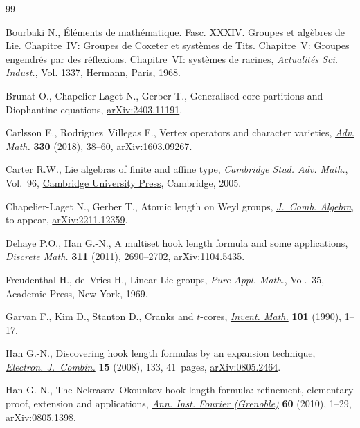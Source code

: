 \documentclass[pdftex]{sigma}
\numberwithin{equation}{section}
\begin{document}
\begin{thebibliography}{99}
\footnotesize\itemsep=0pt

Bourbaki N., \'El\'ements de math\'ematique. {F}asc. {XXXIV}. {G}roupes et
 alg\`ebres de {L}ie. {C}hapitre~{IV}: {G}roupes de {C}oxeter et syst\`emes de
 {T}its. {C}hapitre~{V}: {G}roupes engendr\'es par des r\'eflexions.
 {C}hapitre~{VI}: syst\`emes de racines, \textit{Actualit\'es Sci. Indust.},
 Vol. 1337, Hermann, Paris, 1968.

Brunat O., Chapelier-Laget N., Gerber T., Generalised core partitions and
 {D}iophantine equations, \href{https://arxiv.org/abs/2403.11191}{arXiv:2403.11191}.

Carlsson E., Rodriguez~Villegas F., Vertex operators and character varieties,
 \href{https://doi.org/10.1016/j.aim.2017.12.024}{\textit{Adv. Math.}} \textbf{330} (2018), 38--60, \href{https://arxiv.org/abs/1603.09267}{arXiv:1603.09267}.

Carter R.W., Lie algebras of finite and affine type, \textit{Cambridge Stud.
 Adv. Math.}, Vol.~96, \href{https://doi.org/10.1017/CBO9780511614910}{Cambridge University Press}, Cambridge, 2005.

Chapelier-Laget N., Gerber T., Atomic length on {W}eyl groups, \href{https://doi.org/10.4171/JCA/104}{\textit{J.~Comb.
 Algebra}}, {t}o appear, \href{https://arxiv.org/abs/2211.12359}{arXiv:2211.12359}.

Dehaye P.O., Han G.-N., A multiset hook length formula and some applications,
 \href{https://doi.org/10.1016/j.disc.2011.08.018}{\textit{Discrete Math.}} \textbf{311} (2011), 2690--2702, \href{https://arxiv.org/abs/1104.5435}{arXiv:1104.5435}.

Freudenthal H., de~Vries H., Linear {L}ie groups, \textit{Pure Appl. Math.},
 Vol.~35, Academic Press, New York, 1969.

Garvan F., Kim D., Stanton D., Cranks and {$t$}-cores, \href{https://doi.org/10.1007/BF01231493}{\textit{Invent. Math.}}
 \textbf{101} (1990), 1--17.

Han G.-N., Discovering hook length formulas by an expansion technique,
 \href{https://doi.org/10.37236/857}{\textit{Electron. J.~Combin.}} \textbf{15} (2008), 133, 41~pages,
 \href{https://arxiv.org/abs/0805.2464}{arXiv:0805.2464}.

Han G.-N., The {N}ekrasov--{O}kounkov hook length formula: refinement,
 elementary proof, extension and applications, \href{https://doi.org/10.5802/aif.2515}{\textit{Ann. Inst. Fourier
 (Grenoble)}} \textbf{60} (2010), 1--29, \href{https://arxiv.org/abs/0805.1398}{arXiv:0805.1398}.


\end{thebibliography}
\end{document}
